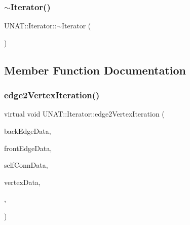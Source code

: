 \subsubsection{\texorpdfstring{$\sim$Iterator()}{~Iterator()}\hspace{0.1cm}{\footnotesize\ttfamily [2/2]}}
{\footnotesize\ttfamily U\+N\+A\+T\+::\+Iterator\+::$\sim$\+Iterator (\begin{DoxyParamCaption}{ }\end{DoxyParamCaption})\hspace{0.3cm}{\ttfamily [inline]}}



\subsection{Member Function Documentation}
\mbox{\label{classUNAT_1_1Iterator_a59fb9d4c251dd0456078decabf332399}} 
\subsubsection{\texorpdfstring{edge2VertexIteration()}{edge2VertexIteration()}\hspace{0.1cm}{\footnotesize\ttfamily [1/2]}}
{\footnotesize\ttfamily virtual void U\+N\+A\+T\+::\+Iterator\+::edge2\+Vertex\+Iteration (\begin{DoxyParamCaption}\item[{\mbox{\hyperlink{structArrays}{Arrays}} $\ast$}]{back\+Edge\+Data,  }\item[{\mbox{\hyperlink{structArrays}{Arrays}} $\ast$}]{front\+Edge\+Data,  }\item[{\mbox{\hyperlink{structArrays}{Arrays}} $\ast$}]{self\+Conn\+Data,  }\item[{\mbox{\hyperlink{structArrays}{Arrays}} $\ast$}]{vertex\+Data,  }\item[{\mbox{\hyperlink{test_2directSegment_2iterator_8h_ae588e578b6781906a44208130df0ab29}{e2v\+\_\+host\+Fun\+Ptr}}}]{,  }\item[{\mbox{\hyperlink{test_2directSegment_2iterator_8h_a7b58029f74760f3ca5384034c0e89c15}{e2v\+\_\+slave\+Fun\+Ptr}}}]{ }\end{DoxyParamCaption})\hspace{0.3cm}{\ttfamily [pure virtual]}}



